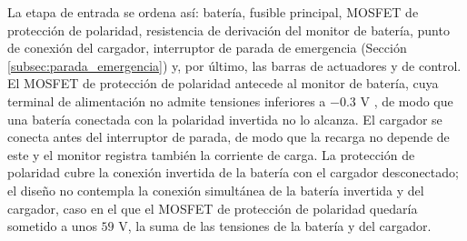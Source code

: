 \documentclass[../../General.tex]{subfiles}
\begin{document}
La etapa de entrada se ordena así: batería, fusible principal, MOSFET de protección de polaridad, resistencia de derivación del monitor de batería, punto de conexión del cargador, interruptor de parada de emergencia (Sección \ref{subsec:parada_emergencia}) y, por último, las barras de actuadores y de control. El MOSFET de protección de polaridad antecede al monitor de batería, cuya terminal de alimentación no admite tensiones inferiores a $-0.3\text{ V}$ \citep{adi_ltc2944}, de modo que una batería conectada con la polaridad invertida no lo alcanza. El cargador se conecta antes del interruptor de parada, de modo que la recarga no depende de este y el monitor registra también la corriente de carga. La protección de polaridad cubre la conexión invertida de la batería con el cargador desconectado; el diseño no contempla la conexión simultánea de la batería invertida y del cargador, caso en el que el MOSFET de protección de polaridad quedaría sometido a unos $59\text{ V}$, la suma de las tensiones de la batería y del cargador.
\end{document}

